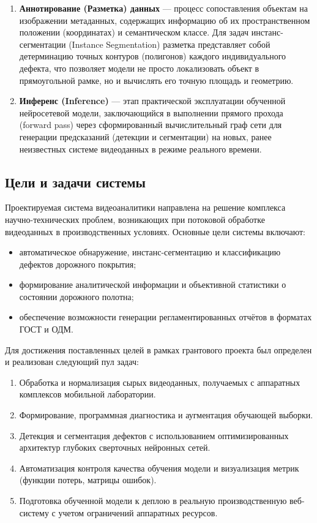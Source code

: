 \documentclass[a4paper,12pt]{article}
\begin{document}
\begin{enumerate}
    \item \textbf{Аннотирование (Разметка) данных} --- процесс сопоставления объектам на изображении метаданных, содержащих информацию об их пространственном положении (координатах) и семантическом классе. Для задач инстанс-сегментации (Instance Segmentation) разметка представляет собой детерминацию точных контуров (полигонов) каждого индивидуального дефекта, что позволяет модели не просто локализовать объект в прямоугольной рамке, но и вычислять его точную площадь и геометрию.

    \item \textbf{Инференс (Inference)} --- этап практической эксплуатации обученной нейросетевой модели, заключающийся в выполнении прямого прохода (forward pass) через сформированный вычислительный граф сети для генерации предсказаний (детекции и сегментации) на новых, ранее неизвестных системе видеоданных в режиме реального времени.
\end{enumerate}

\subsection{Цели и задачи системы}

Проектируемая система видеоаналитики направлена на решение комплекса научно-технических проблем, возникающих при потоковой обработке видеоданных в производственных условиях. Основные цели системы включают:
\begin{itemize}
    \item автоматическое обнаружение, инстанс-сегментацию и классификацию дефектов дорожного покрытия;
    \item формирование аналитической информации и объективной статистики о состоянии дорожного полотна;
    \item обеспечение возможности генерации регламентированных отчётов в форматах ГОСТ и ОДМ.
\end{itemize}

Для достижения поставленных целей в рамках грантового проекта был определен и реализован следующий пул задач:
\begin{enumerate}
    \item Обработка и нормализация сырых видеоданных, получаемых с аппаратных комплексов мобильной лаборатории.
    \item Формирование, программная диагностика и аугментация обучающей выборки.
    \item Детекция и сегментация дефектов с использованием оптимизированных архитектур глубоких сверточных нейронных сетей.
    \item Автоматизация контроля качества обучения модели и визуализация метрик (функции потерь, матрицы ошибок).
    \item Подготовка обученной модели к деплою в реальную производственную веб-систему с учетом ограничений аппаратных ресурсов.
\end{enumerate}
\end{document}
